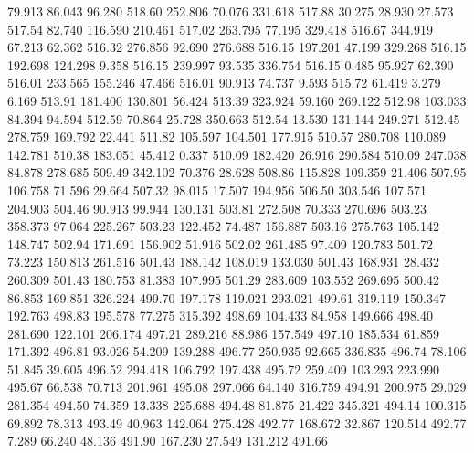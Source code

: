   79.913   86.043   96.280       518.60
 252.806   70.076  331.618       517.88
  30.275   28.930   27.573       517.54
  82.740  116.590  210.461       517.02
 263.795   77.195  329.418       516.67
 344.919   67.213   62.362       516.32
 276.856   92.690  276.688       516.15
 197.201   47.199  329.268       516.15
 192.698  124.298    9.358       516.15
 239.997   93.535  336.754       516.15
   0.485   95.927   62.390       516.01
 233.565  155.246   47.466       516.01
  90.913   74.737    9.593       515.72
  61.419    3.279    6.169       513.91
 181.400  130.801   56.424       513.39
 323.924   59.160  269.122       512.98
 103.033   84.394   94.594       512.59
  70.864   25.728  350.663       512.54
  13.530  131.144  249.271       512.45
 278.759  169.792   22.441       511.82
 105.597  104.501  177.915       510.57
 280.708  110.089  142.781       510.38
 183.051   45.412    0.337       510.09
 182.420   26.916  290.584       510.09
 247.038   84.878  278.685       509.49
 342.102   70.376   28.628       508.86
 115.828  109.359   21.406       507.95
 106.758   71.596   29.664       507.32
  98.015   17.507  194.956       506.50
 303.546  107.571  204.903       504.46
  90.913   99.944  130.131       503.81
 272.508   70.333  270.696       503.23
 358.373   97.064  225.267       503.23
 122.452   74.487  156.887       503.16
 275.763  105.142  148.747       502.94
 171.691  156.902   51.916       502.02
 261.485   97.409  120.783       501.72
  73.223  150.813  261.516       501.43
 188.142  108.019  133.030       501.43
 168.931   28.432  260.309       501.43
 180.753   81.383  107.995       501.29
 283.609  103.552  269.695       500.42
  86.853  169.851  326.224       499.70
 197.178  119.021  293.021       499.61
 319.119  150.347  192.763       498.83
 195.578   77.275  315.392       498.69
 104.433   84.958  149.666       498.40
 281.690  122.101  206.174       497.21
 289.216   88.986  157.549       497.10
 185.534   61.859  171.392       496.81
  93.026   54.209  139.288       496.77
 250.935   92.665  336.835       496.74
  78.106   51.845   39.605       496.52
 294.418  106.792  197.438       495.72
 259.409  103.293  223.990       495.67
  66.538   70.713  201.961       495.08
 297.066   64.140  316.759       494.91
 200.975   29.029  281.354       494.50
  74.359   13.338  225.688       494.48
  81.875   21.422  345.321       494.14
 100.315   69.892   78.313       493.49
  40.963  142.064  275.428       492.77
 168.672   32.867  120.514       492.77
   7.289   66.240   48.136       491.90
 167.230   27.549  131.212       491.66
